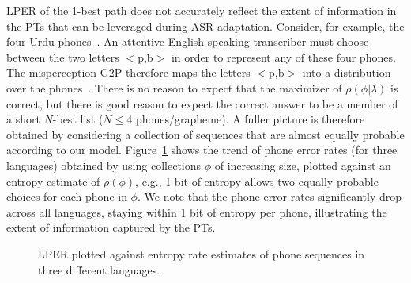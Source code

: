 

LPER of the 1-best path does not
accurately reflect the extent of information in the PTs that can be
leveraged during ASR adaptation.  Consider, for example, the four
Urdu phones~\ipa{[p,p\textsuperscript{h},b,\"*b]}.  An attentive
English-speaking transcriber must choose between the two letters
$<$p,b$>$ in order to represent any of these four phones.  The
misperception G2P therefore maps the letters $<$p,b$>$ into a
distribution over the phones~\ipa{[p,p\textsuperscript{h},b,\"*b]}.
There is no reason to expect that the maximizer of
$\rho(\phi|\lambda)$ is correct, but there is good reason to expect
the correct answer to be a member of a short $N$-best list ($N\le 4$
phones/grapheme).  A fuller picture is therefore obtained by
considering a collection of sequences that are almost equally 
probable according to our model. Figure~\ref{fig:listPER}
shows the trend of phone error rates (for three languages) obtained by
using collections $\phi$ of increasing size, plotted against an
entropy estimate of $\rho(\phi)$, e.g., 1 bit of entropy allows two equally
probable choices for each phone in $\phi$. We note that the phone
error rates significantly drop across all languages, staying within 1
bit of entropy per phone, illustrating the extent of information
captured by the PTs.

\begin{figure}[t!]
  
  \vspace*{-0.5cm}
  \caption{LPER plotted against entropy rate estimates of phone sequences in three different languages.}
\label{fig:listPER}
\end{figure}

